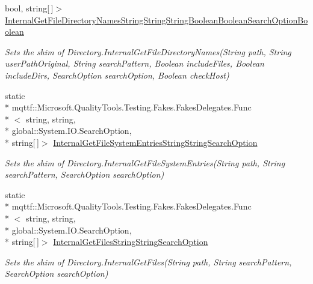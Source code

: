 \begin{DoxyCompactItemize}
bool, string\mbox{[}$\,$\mbox{]}$>$ \hyperlink{class_system_1_1_i_o_1_1_fakes_1_1_shim_directory_a445c777c0e38d9d717ab78e41c49a94e}{Internal\-Get\-File\-Directory\-Names\-String\-String\-String\-Boolean\-Boolean\-Search\-Option\-Boolean}
\begin{DoxyCompactList}\small\item\em Sets the shim of Directory.\-Internal\-Get\-File\-Directory\-Names(\-String path, String user\-Path\-Original, String search\-Pattern, Boolean include\-Files, Boolean include\-Dirs, Search\-Option search\-Option, Boolean check\-Host)\end{DoxyCompactList}\item 
static \\*
mqttf\-::\-Microsoft.\-Quality\-Tools.\-Testing.\-Fakes.\-Fakes\-Delegates.\-Func\\*
$<$ string, string, \\*
global\-::\-System.\-I\-O.\-Search\-Option, \\*
string\mbox{[}$\,$\mbox{]}$>$ \hyperlink{class_system_1_1_i_o_1_1_fakes_1_1_shim_directory_a847512d8fe34dbb0d81f38fafd626da0}{Internal\-Get\-File\-System\-Entries\-String\-String\-Search\-Option}
\begin{DoxyCompactList}\small\item\em Sets the shim of Directory.\-Internal\-Get\-File\-System\-Entries(\-String path, String search\-Pattern, Search\-Option search\-Option)\end{DoxyCompactList}\item 
static \\*
mqttf\-::\-Microsoft.\-Quality\-Tools.\-Testing.\-Fakes.\-Fakes\-Delegates.\-Func\\*
$<$ string, string, \\*
global\-::\-System.\-I\-O.\-Search\-Option, \\*
string\mbox{[}$\,$\mbox{]}$>$ \hyperlink{class_system_1_1_i_o_1_1_fakes_1_1_shim_directory_acadb72968d0b02db0a4c7cca87065483}{Internal\-Get\-Files\-String\-String\-Search\-Option}
\begin{DoxyCompactList}\small\item\em Sets the shim of Directory.\-Internal\-Get\-Files(\-String path, String search\-Pattern, Search\-Option search\-Option)\end{DoxyCompactList}\item 

\end{DoxyCompactItemize}
